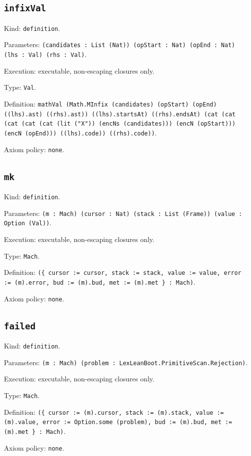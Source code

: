 \documentclass[11pt]{article}
\begin{document}
\subsection*{\texttt{infixVal}}
\noindent Kind: \texttt{definition}.\par
\noindent Parameters: \texttt{(candidates : List (Nat)) (opStart : Nat) (opEnd : Nat) (lhs : Val) (rhs : Val)}.\par
\noindent Execution: executable, non-escaping closures only.\par
\noindent Type: \texttt{Val}.\par
\noindent Definition: \texttt{mathVal (Math.MInfix (candidates) (opStart) (opEnd) ((lhs).ast) ((rhs).ast)) ((lhs).startsAt) ((rhs).endsAt) (cat (cat (cat (cat (cat (lit ("X")) (encNs (candidates))) (encN (opStart))) (encN (opEnd))) ((lhs).code)) ((rhs).code))}.\par
\noindent Axiom policy: \texttt{none}.\par
\subsection*{\texttt{mk}}
\noindent Kind: \texttt{definition}.\par
\noindent Parameters: \texttt{(m : Mach) (cursor : Nat) (stack : List (Frame)) (value : Option (Val))}.\par
\noindent Execution: executable, non-escaping closures only.\par
\noindent Type: \texttt{Mach}.\par
\noindent Definition: \texttt{(\{ cursor := cursor, stack := stack, value := value, error := (m).error, bud := (m).bud, met := (m).met \} : Mach)}.\par
\noindent Axiom policy: \texttt{none}.\par
\subsection*{\texttt{failed}}
\noindent Kind: \texttt{definition}.\par
\noindent Parameters: \texttt{(m : Mach) (problem : LexLeanBoot.PrimitiveScan.Rejection)}.\par
\noindent Execution: executable, non-escaping closures only.\par
\noindent Type: \texttt{Mach}.\par
\noindent Definition: \texttt{(\{ cursor := (m).cursor, stack := (m).stack, value := (m).value, error := Option.some (problem), bud := (m).bud, met := (m).met \} : Mach)}.\par
\noindent Axiom policy: \texttt{none}.\par
\end{document}
